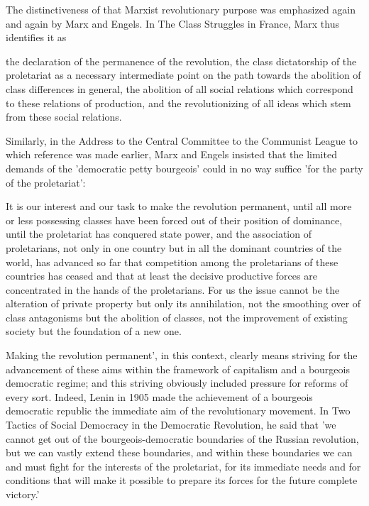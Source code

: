 The distinctiveness of that Marxist revolutionary purpose was emphasized again and again by Marx and Engels. In The Class Struggles in France, Marx thus identifies it as
\begin{displayquote}
    the declaration of the permanence of the revolution, the class dictatorship of the proletariat as a necessary intermediate point on the path towards the abolition of class differences in general, the abolition of all social relations which correspond to these relations of production, and the revolutionizing of all ideas which stem from these social relations.
\end{displayquote}

Similarly, in the Address to the Central Committee to the Communist League to which reference was made earlier, Marx and Engels insisted that the limited demands of the 'democratic petty bourgeois' could in no way suffice 'for the party of the proletariat':
\begin{displayquote}
    It is our interest and our task to make the revolution permanent, until all more or less possessing classes have been forced out of their position of dominance, until the proletariat has conquered state power, and the association of proletarians, not only in one country but in all the dominant countries of the world, has advanced so far that competition among the proletarians of these countries has ceased and that at least the decisive productive forces are concentrated in the hands of the proletarians. For us the issue cannot be the alteration of private property but only its annihilation, not the smoothing over of class antagonisms but the abolition of classes, not the improvement of existing society but the foundation of a new one.
\end{displayquote}

Making the revolution permanent', in this context, clearly  means striving for the advancement of these aims within the framework of capitalism and a bourgeois democratic regime; and this striving obviously included pressure for reforms of every sort. Indeed, Lenin in 1905 made the achievement of a bourgeois democratic republic the immediate aim of the revolutionary movement. In Two Tactics of Social Democracy in the Democratic Revolution, he said that 'we cannot get out of the bourgeois-democratic boundaries of the Russian revolution, but we can vastly extend these boundaries, and within these boundaries we can and must fight for the interests of the proletariat, for its immediate needs and for conditions that will make it possible to prepare its forces for the future complete victory.'

